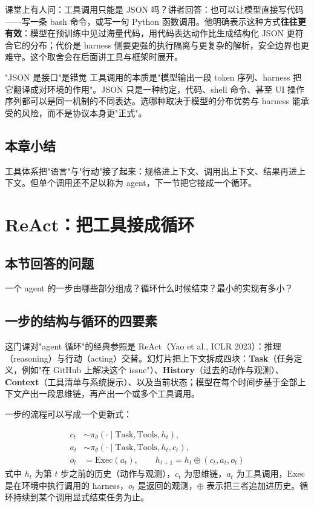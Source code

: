 \documentclass[a4paper]{article}
\begin{document}
课堂上有人问：工具调用只能是 JSON 吗？讲者回答：也可以让模型直接写代码——写一条 bash 命令，或写一句 Python 函数调用。他明确表示这种方式\textbf{往往更有效}：模型在预训练中见过海量代码，用代码表达动作比生成结构化 JSON 更符合它的分布；代价是 harness 侧要更强的执行隔离与更复杂的解析，安全边界也更难守。这个取舍会在后面讲工具与框架时展开。

\begin{warningbox}{"JSON 是接口"是错觉}
工具调用的本质是"模型输出一段 token 序列、harness 把它翻译成对环境的作用"。JSON 只是一种约定，代码、shell 命令、甚至 UI 操作序列都可以是同一机制的不同表达。选哪种取决于模型的分布优势与 harness 能承受的风险，而不是协议本身更"正式"。
\end{warningbox}

\subsection{本章小结}
工具体系把"语言"与"行动"接了起来：规格进上下文、调用出上下文、结果再进上下文。但单个调用还不足以称为 agent，下一节把它接成一个循环。

\section{ReAct：把工具接成循环}

\subsection*{本节回答的问题}
一个 agent 的一步由哪些部分组成？循环什么时候结束？最小的实现有多小？

\subsection{一步的结构与循环的四要素}

这门课对"agent 循环"的经典参照是 ReAct（Yao et al., ICLR 2023）：推理（reasoning）与行动（acting）交替。幻灯片把上下文拆成四块：\textbf{Task}（任务定义，例如"在 GitHub 上解决这个 issue"）、\textbf{History}（过去的动作与观测）、\textbf{Context}（工具清单与系统提示）、以及当前状态；模型在每个时间步基于全部上下文产出一段思维链，再产出一个或多个工具调用。

一步的流程可以写成一个更新式：

\begin{equation}
\begin{aligned}
c_t &\sim \pi_\theta(\cdot \mid \text{Task}, \text{Tools}, h_t), \\
a_t &\sim \pi_\theta(\cdot \mid \text{Task}, \text{Tools}, h_t, c_t), \\
o_t &= \mathrm{Exec}(a_t), \qquad h_{t+1} = h_t \oplus (c_t, a_t, o_t)
\end{aligned}
\end{equation}
式中 $h_t$ 为第 $t$ 步之前的历史（动作与观测），$c_t$ 为思维链，$a_t$ 为工具调用，$\mathrm{Exec}$ 是在环境中执行调用的 harness，$o_t$ 是返回的观测，$\oplus$ 表示把三者追加进历史。循环持续到某个调用显式结束任务为止。
\end{document}
